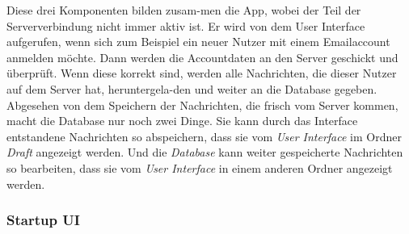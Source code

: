 \documentclass[a4paper,11pt]{article}
\begin{document}
\nohyphenation

Diese drei Komponenten bilden zusam-men die App, wobei der Teil der Serververbindung nicht immer aktiv ist. Er wird von dem User Interface
aufgerufen, wenn sich zum Beispiel ein neuer Nutzer mit einem Emailaccount anmelden möchte. Dann werden die Accountdaten an den Server geschickt und überprüft.
Wenn diese korrekt sind, werden alle Nachrichten, die dieser Nutzer auf dem Server hat, heruntergela-den und weiter an die Database gegeben. Abgesehen von dem 
Speichern der Nachrichten, die frisch vom Server kommen, macht die Database nur noch zwei Dinge. Sie kann durch das Interface entstandene Nachrichten so abspeichern, dass sie 
vom \textit{User Interface} im Ordner \textit{Draft} angezeigt werden. Und die \textit{Database} kann weiter gespeicherte Nachrichten so bearbeiten, dass sie vom 
\textit{User Interface} in einem anderen Ordner angezeigt werden.

\endgroup

\subsubsection{Startup UI}


\end{document}
